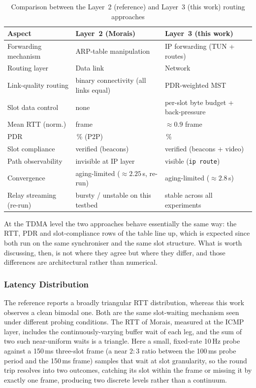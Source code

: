 \begin{table}[h]
\centering
\caption{Comparison between the Layer~2 (reference) and Layer~3 (this work)
routing approaches}
\label{tab:comparison}
\renewcommand{\arraystretch}{1.25}
\begin{tabular}{@{}>{\raggedright\arraybackslash}p{}>{\raggedright\arraybackslash}p{}>{\raggedright\arraybackslash}p{}@{}}
\toprule
\textbf{Aspect} & \textbf{Layer~2 (Morais)} & \textbf{Layer~3 (this work)} \\
\midrule
Forwarding mechanism & ARP-table manipulation & IP forwarding (TUN + routes) \\
Routing layer        & Data link             & Network \\
Link-quality routing & binary connectivity (all links equal) & PDR-weighted MST \\
Slot data control    & none                  & per-slot byte budget + back-pressure \\
Mean RTT (norm.)     & 0.88 frame            & $\approx 0.9$ frame \\
PDR                  & 100\,\% (P2P)         & 100\,\% \\
Slot compliance      & verified (beacons)    & verified (beacons + video) \\
Path observability   & invisible at IP layer & visible (\texttt{ip route}) \\
Convergence          & aging-limited ($\approx 2.25$\,s, re-run) & aging-limited ($\approx 2.8$\,s) \\
Relay streaming (re-run) & bursty / unstable on this testbed & stable across all experiments \\
\bottomrule
\end{tabular}
\end{table}

At the TDMA level the two approaches behave essentially the same way: the
RTT, PDR and slot-compliance rows of the table line up, which is expected since
both run on the same synchroniser and the same slot structure. What is worth
discussing, then, is not where they agree but where they differ, and those
differences are architectural rather than numerical.

\subsubsection{Latency Distribution}

The reference reports a broadly triangular RTT
distribution, whereas this work observes a clean bimodal one. Both are the
same slot-waiting mechanism seen under different probing conditions. The RTT of
Morais, measured at the ICMP layer, includes the continuously-varying buffer
wait of each leg, and the sum of two such near-uniform waits is a triangle.
Here a small, fixed-rate 10\,Hz probe against a 150\,ms three-slot frame (a
near $2{:}3$ ratio between the 100\,ms probe period and the 150\,ms frame)
samples that wait at slot granularity, so the round trip resolves into two
outcomes, catching its slot within the frame or missing it by exactly one
frame, producing two discrete levels rather than a continuum.


